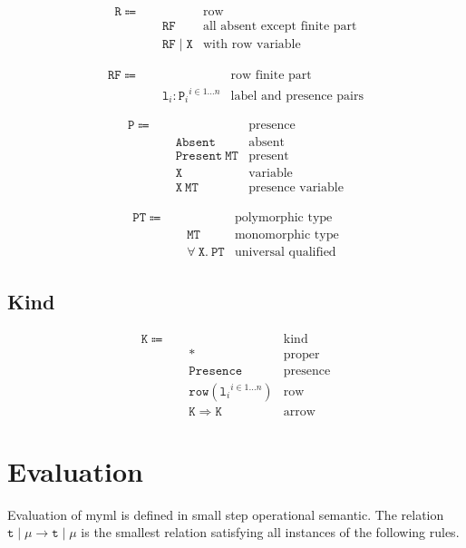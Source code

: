 \documentclass{report}
\newcommand{\theLang}{myml}
\newcommand{\code}{\mathtt}
\begin{document}
\begin{align*}
\code{R} \Coloneqq \quad & & \text{row} \\
& \code{RF} & \text{all absent except finite part} \\
& \code{RF \mid X} & \text{with row variable}
\end{align*}

\begin{align*}
\code{RF} \Coloneqq \quad & & \text{row finite part} \\
& {\code{l}_i : \code{P}_i}^{i \in 1\dots n} & \text{label and presence pairs}
\end{align*}

\begin{align*}
\code{P} \Coloneqq \quad & & \text{presence} \\
& \code{Absent} & \text{absent} \\
& \code{Present\ MT} & \text{present} \\
& \code{X} & \text{variable} \\
& \code{X\ MT} & \text{presence variable}
\end{align*}

\begin{align*}
\code{PT} \Coloneqq\quad & & \text{polymorphic type} \\
& \code{MT} & \text{monomorphic type} \\
& \code{\forall\ X.\ PT} & \text{universal qualified}
\end{align*}

\subsection{Kind}

\begin{align*}
\code{K} \Coloneqq \quad & & \text{kind} \\
& \code{*} & \text{proper} \\
& \code{Presence} & \text{presence} \\
& \code{row}({\code{l}_i}^{i \in 1\dots n}) & \text{row} \\
& \code{K \Rightarrow K} & \text{arrow}
\end{align*}

\section{Evaluation}

Evaluation of \theLang{} is defined in small step operational semantic. The relation \(\code{t}\mid\mu \longrightarrow \code{t}\mid\mu\) is the smallest relation satisfying all instances of the following rules.
\end{document}
